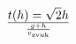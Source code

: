 \documentclass[preview]{standalone}
\begin{document}
\begin{align*}
t(h) = \sqrt 2h} \over {g  + h\over{v_{\text{zvuk}}}
\end{align*}
\end{document}
